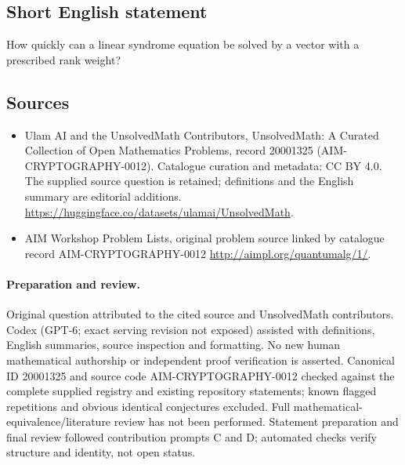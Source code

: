 \documentclass[11pt]{article}
\begin{document}
\subsection{Short English statement}
How quickly can a linear syndrome equation be solved by a vector with a prescribed rank weight?
\subsection{Sources}
\begin{itemize}
\item[\hypertarget{source:20001325:1}{S1}] Ulam AI and the UnsolvedMath Contributors, UnsolvedMath: A Curated Collection of Open Mathematics Problems, record 20001325 (AIM-CRYPTOGRAPHY-0012). Catalogue curation and metadata: CC BY 4.0. The supplied source question is retained; definitions and the English summary are editorial additions.
\url{https://huggingface.co/datasets/ulamai/UnsolvedMath}.
\item[\hypertarget{source:20001325:2}{S2}] AIM Workshop Problem Lists, original problem source linked by catalogue record AIM-CRYPTOGRAPHY-0012
\url{http://aimpl.org/quantumalg/1/}.
\end{itemize}
\paragraph{Preparation and review.}
Original question attributed to the cited source and UnsolvedMath contributors. Codex (GPT-6; exact serving revision not exposed) assisted with definitions, English summaries, source inspection and formatting. No new human mathematical authorship or independent proof verification is asserted. Canonical ID 20001325 and source code AIM-CRYPTOGRAPHY-0012 checked against the complete supplied registry and existing repository statements; known flagged repetitions and obvious identical conjectures excluded. Full mathematical-equivalence/literature review has not been performed. Statement preparation and final review followed contribution prompts C and D; automated checks verify structure and identity, not open status.
\label{end:20001325}
\end{document}
